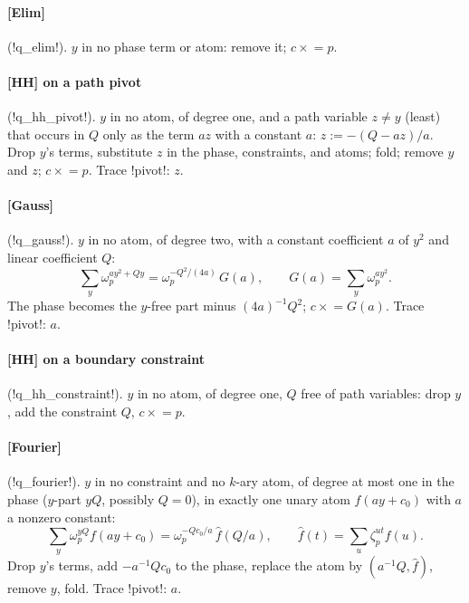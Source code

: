 \paragraph{[Elim]} (\code!q_elim!). $y$ in no phase term or atom: remove it; $c\mathrel{\times}=p$.

\paragraph{[HH] on a path pivot} (\code!q_hh_pivot!). $y$ in no atom, of degree one, and a path variable $z\ne y$ (least) that occurs in $Q$ only as the term $az$ with a constant $a$: $z:=-(Q-az)/a$. Drop $y$'s terms, substitute $z$ in the phase, constraints, and atoms; fold; remove $y$ and $z$; $c\mathrel{\times}=p$. Trace \code!pivot!: $z$.

\paragraph{[Gauss]} (\code!q_gauss!). $y$ in no atom, of degree two, with a constant coefficient $a$ of $y^2$ and linear coefficient $Q$:
\begin{equation}
\sum_y\omega_p^{ay^2+Qy}=\omega_p^{-Q^2/(4a)}\,G(a),\qquad G(a)=\sum_y\omega_p^{ay^2}.
\end{equation}
The phase becomes the $y$-free part minus $(4a)^{-1}Q^2$; $c\mathrel{\times}=G(a)$. Trace \code!pivot!: $a$.

\paragraph{[HH] on a boundary constraint} (\code!q_hh_constraint!). $y$ in no atom, of degree one, $Q$ free of path variables: drop $y$, add the constraint $Q$, $c\mathrel{\times}=p$.

\paragraph{[Fourier]} (\code!q_fourier!). $y$ in no constraint and no $k$-ary atom, of degree at most one in the phase ($y$-part $yQ$, possibly $Q=0$), in exactly one unary atom $f(ay+c_0)$ with $a$ a nonzero constant:
\begin{equation}
\sum_y\omega_p^{yQ}f(ay+c_0)=\omega_p^{-Qc_0/a}\,\hat f(Q/a),\qquad\hat f(t)=\sum_u\zeta_p^{ut}f(u).
\end{equation}
Drop $y$'s terms, add $-a^{-1}Qc_0$ to the phase, replace the atom by $(a^{-1}Q,\hat f)$, remove $y$, fold. Trace \code!pivot!: $a$.

